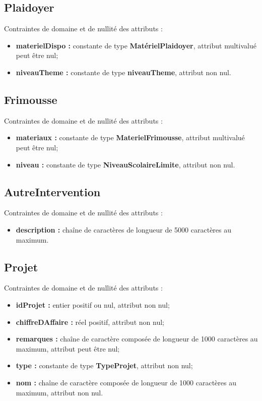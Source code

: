 \documentclass[asi, sansVersion]{picInsa}
\begin{document}
\subsection*{Plaidoyer}
Contraintes de domaine et de nullité des attributs :
\begin{itemize}
	\item \textbf{materielDispo :} constante de type \textbf{MatérielPlaidoyer}, attribut multivalué peut être nul; 
	\item \textbf{niveauTheme :} constante de type \textbf{niveauTheme}, attribut non nul.\\
\end{itemize}

\subsection*{Frimousse}
Contraintes de domaine et de nullité des attributs :
\begin{itemize}
	\item \textbf{materiaux :} constante de type \textbf{MaterielFrimousse}, attribut multivalué peut être nul;
	\item \textbf{niveau :} constante de type \textbf{NiveauScolaireLimite}, attribut non nul.\\
\end{itemize}

\subsection*{AutreIntervention}
Contraintes de domaine et de nullité des attributs :
\begin{itemize}
\item \textbf{description :} chaîne de caractères de longueur de 5000 caractères au maximum.\\
\end{itemize}

\subsection*{Projet}
Contraintes de domaine et de nullité des attributs :
\begin{itemize}
 	\item \textbf{idProjet :} entier positif ou nul, attribut non nul;
	\item \textbf{chiffreDAffaire :} réel positif, attribut non nul;
	\item \textbf{remarques :} chaîne de caractère composée de longueur de 1000 caractères au maximum, attribut peut être nul;
	\item \textbf{type :} constante de type \textbf{TypeProjet}, attribut non nul;
	\item \textbf{nom :} chaîne de caractère composée de longueur de 1000 caractères au maximum, attribut non nul.\\  
\end{itemize} 
\end{document}
